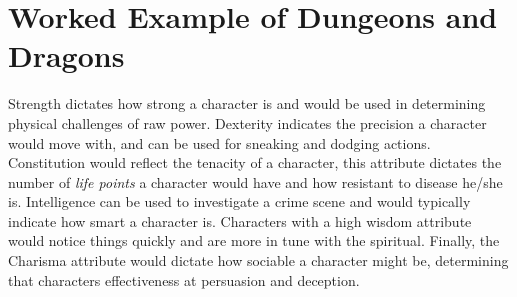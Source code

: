 \documentclass[final]{cmpreport}
\begin{document}
	\section{Worked Example of Dungeons and Dragons} \label{app:worked-example}
	Strength dictates how strong a character is and would be used in determining physical challenges of raw power. Dexterity indicates the precision a character would move with, and can be used for sneaking and dodging actions. Constitution would reflect the tenacity of a character, this attribute dictates the number of \emph{life points} a character would have and how resistant to disease he/she is. Intelligence can be used to investigate a crime scene and would typically indicate how smart a character is. Characters with a high wisdom attribute would notice things quickly and are more in tune with the spiritual. Finally, the Charisma attribute would dictate how sociable a character might be, determining that characters effectiveness at persuasion and deception. 
	
	\clearpage	
	
\end{document}
